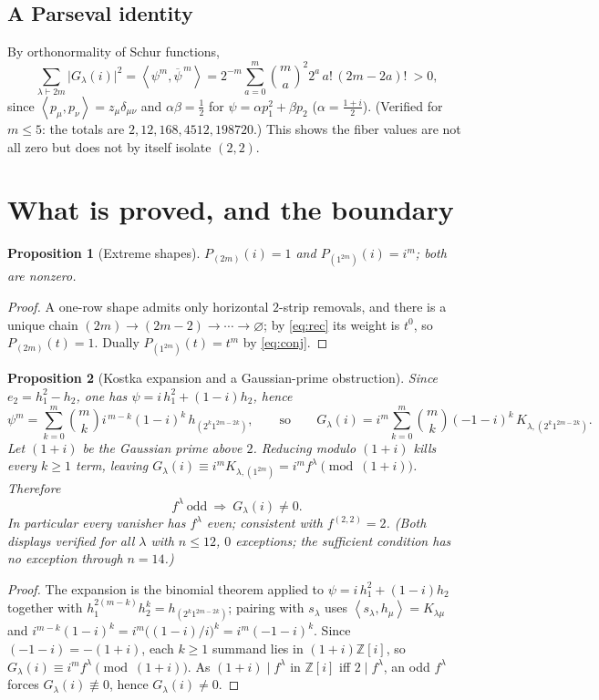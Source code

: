 \documentclass[11pt]{article}
\newtheorem{proposition}{Proposition}
\theoremstyle{definition}
\theoremstyle{remark}
\newcommand{\ZZ}{\mathbb{Z}}
\newcommand{\la}{\lambda}
\newcommand{\inner}[1]{\left\langle #1 \right\rangle}
\newcommand{\psib}{\overline{\psi}}
\begin{document}
\subsection{A Parseval identity}
By orthonormality of Schur functions,
\begin{equation}\label{eq:parseval}
  \sum_{\la\vdash2m}\big|G_\la(i)\big|^2
   =\inner{\psi^m,\psib^{\,m}}
   =2^{-m}\sum_{a=0}^{m}\binom{m}{a}^{2}2^{a}\,a!\,(2m-2a)!\ >0,
\end{equation}
since $\inner{p_\mu,p_\nu}=z_\mu\delta_{\mu\nu}$ and $\alpha\beta=\tfrac12$ for
$\psi=\alpha p_1^2+\beta p_2$ ($\alpha=\tfrac{1+i}2$). (Verified for $m\le5$:
the totals are $2,12,168,4512,198720$.) This shows the fiber values are not all
zero but does not by itself isolate $(2,2)$.

\section{What is proved, and the boundary}

\begin{proposition}[Extreme shapes]\label{prop:extreme}
$P_{(2m)}(i)=1$ and $P_{(1^{2m})}(i)=i^{m}$; both are nonzero.
\end{proposition}
\begin{proof}
A one-row shape admits only horizontal $2$-strip removals, and there is a unique
chain $(2m)\to(2m-2)\to\cdots\to\varnothing$; by \eqref{eq:rec} its weight is
$t^{0}$, so $P_{(2m)}(t)=1$. Dually $P_{(1^{2m})}(t)=t^{m}$ by \eqref{eq:conj}.
\end{proof}

\begin{proposition}[Kostka expansion and a Gaussian-prime obstruction]\label{prop:kostka}
Since $e_2=h_1^2-h_2$, one has $\psi=i\,h_1^2+(1-i)h_2$, hence
\[
  \psi^m=\sum_{k=0}^m\binom mk i^{\,m-k}(1-i)^k\,h_{(2^k1^{2m-2k})},
  \qquad\text{so}\qquad
  G_\la(i)=i^m\sum_{k=0}^m\binom mk(-1-i)^k\,K_{\la,(2^k1^{2m-2k})} .
\]
Let $(1+i)$ be the Gaussian prime above $2$. Reducing modulo $(1+i)$ kills every
$k\ge1$ term, leaving $G_\la(i)\equiv i^m K_{\la,(1^{2m})}=i^m f^\la\pmod{(1+i)}$.
Therefore
\[
  f^\la\ \text{odd}\ \Longrightarrow\ G_\la(i)\neq0 .
\]
In particular every vanisher has $f^\la$ even; consistent with $f^{(2,2)}=2$.
(Both displays verified for all $\la$ with $n\le12$, $0$ exceptions; the
sufficient condition has no exception through $n=14$.)
\end{proposition}
\begin{proof}
The expansion is the binomial theorem applied to $\psi=i\,h_1^2+(1-i)h_2$ together
with $h_1^{2(m-k)}h_2^k=h_{(2^k1^{2m-2k})}$; pairing with $s_\la$ uses
$\inner{s_\la,h_\mu}=K_{\la\mu}$ and $i^{m-k}(1-i)^k=i^m\big((1-i)/i\big)^k
=i^m(-1-i)^k$. Since $(-1-i)=-(1+i)$, each $k\ge1$ summand lies in
$(1+i)\ZZ[i]$, so $G_\la(i)\equiv i^m f^\la\pmod{(1+i)}$. As $(1+i)\mid f^\la$ in
$\ZZ[i]$ iff $2\mid f^\la$, an odd $f^\la$ forces $G_\la(i)\not\equiv0$, hence
$G_\la(i)\neq0$.
\end{proof}
\end{document}
